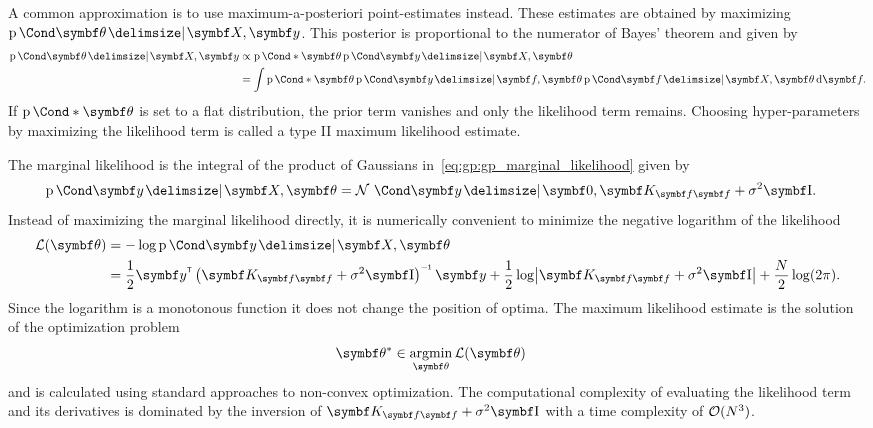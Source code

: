 A common approximation is to use maximum-a-posteriori point-estimates instead.
These estimates are obtained by maximizing $\Prob{\mat{\theta} \given \mat{X}, \mat{y}}$.
This posterior is proportional to the numerator of Bayes' theorem and given by
\begin{equation}
    \begin{split}
        \Prob{\mat{\theta} \given \mat{X}, \mat{y}}
        &\propto \Prob*{\mat{\theta}} \Prob{\mat{y} \given \mat{X}, \mat{\theta}} \\
        &= \int \Prob*{\mat{\theta}}\Prob{\mat{y} \given \mat{f}, \mat{\theta}} \Prob{\mat{f} \given \mat{X}, \mat{\theta}} \diff \mat{f}.
    \end{split}
\end{equation}
If $\Prob*{\mat{\theta}}$ is set to a flat distribution, the prior term vanishes and only the likelihood term remains.
Choosing hyper-parameters by maximizing the likelihood term is called a type II maximum likelihood estimate.

The marginal likelihood is the integral of the product of Gaussians in~\cref{eq:gp:gp_marginal_likelihood} given by
\begin{equation}
    \begin{split}
        \Prob{\mat{y} \given \mat{X}, \mat{\theta}}
        &= \Gaussian{\mat{y} \given \mat{0}, \mat{K}_{\mat{f}\mat{f}} + \sigma^2 \Eye}.
    \end{split}
\end{equation}
Instead of maximizing the marginal likelihood directly, it is numerically convenient to minimize the negative logarithm of the likelihood
\begin{equation}
    \begin{split}
        \Lc(\mat{\theta}) &= -\log\Prob{\mat{y} \given \mat{X}, \mat{\theta}} \\
        &=
        \frac{1}{2} \mat{y}\tran \left( \mat{K}_{\mat{f}\mat{f}} + \sigma^2 \Eye \right)\inv \mat{y} +
        \frac{1}{2} \log \abs*{\mat{K}_{\mat{f}\mat{f}} + \sigma^2 \Eye} +
        \frac{N}{2} \log(2\pi).
    \end{split}
\end{equation}
Since the logarithm is a monotonous function it does not change the position of optima.
The maximum likelihood estimate is the solution of the optimization problem
\begin{align}
    \mat{\theta}^\ast & \in \argmin_{\mat{\theta}} \Lc(\mat{\theta})
\end{align}
and is calculated using standard approaches to non-convex optimization.
The computational complexity of evaluating the likelihood term and its derivatives is dominated by the inversion of $\mat{K}_{\mat{f}\mat{f}} + \sigma^2 \Eye$ with a time complexity of $\operatorname{\mathcal{O}}(N^3)$.

